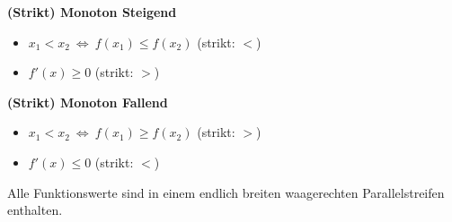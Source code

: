         \textbf{(Strikt) Monoton Steigend}
            \begin{itemize}
                \item $x_1 < x_2\ \Longleftrightarrow\ f(x_1) \leq f(x_2)$ \hfill (strikt: $<$)
                \item $f'(x) \geq 0$ \hfill (strikt: $>$)
            \end{itemize}
        \textbf{(Strikt) Monoton Fallend}
            \begin{itemize}
                \item $x_1 < x_2\ \Longleftrightarrow\ f(x_1) \geq f(x_2)$ \hfill (strikt: $>$)
                \item $f'(x) \leq 0$ \hfill (strikt: $<$)
            \end{itemize}
        Alle Funktionswerte sind in einem endlich breiten waagerechten Parallelstreifen enthalten.

